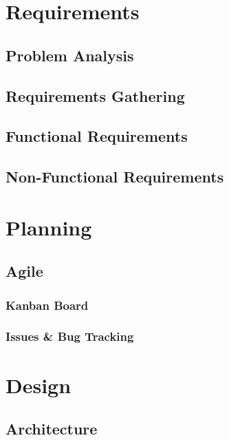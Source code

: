 \documentclass{l4proj}
\begin{document}
\chapter{Requirements}
\label{requirements}

\section{Problem Analysis}

\section{Requirements Gathering}

\section{Functional Requirements}

\section{Non-Functional Requirements}


\chapter{Planning}
\label{planning}

\section{Agile}

\subsection{Kanban Board}

\subsection{Issues \& Bug Tracking}


\chapter{Design}
\label{design}

\section{Architecture}
\end{document}

